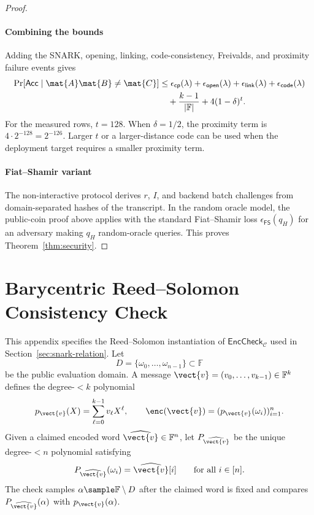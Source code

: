 \begin{proof}
\paragraph{Combining the bounds}
Adding the SNARK, opening, linking, code-consistency, Freivalds, and proximity
failure events gives
\[
\begin{aligned}
\Pr[\mathsf{Acc}\mid\mat{A}\mat{B}\neq\mat{C}]
&\le
\epsilon_{\mathsf{cp}}(\lambda)
+\epsilon_{\mathsf{open}}(\lambda)
+\epsilon_{\mathsf{link}}(\lambda)
+\epsilon_{\mathsf{code}}(\lambda)\\
&\quad+\frac{k-1}{|\mathbb{F}|}+4(1-\delta)^t .
\end{aligned}
\]
For the measured rows, \(t=128\).  When \(\delta=1/2\), the proximity term is
\(4\cdot2^{-128}=2^{-126}\).  Larger \(t\) or a larger-distance code can be
used when the deployment target requires a smaller proximity term.

\paragraph{Fiat--Shamir variant}
The non-interactive protocol derives \(r\), \(I\), and backend batch challenges
from domain-separated hashes of the transcript.  In the random oracle model,
the public-coin proof above applies with the standard Fiat--Shamir loss
\(\epsilon_{\mathsf{FS}}(q_H)\) for an adversary making \(q_H\)
random-oracle queries.
This proves Theorem~\ref{thm:security}.
\end{proof}

\section{Barycentric Reed--Solomon Consistency Check}
\label{app:rs-barycentric}

This appendix specifies the Reed--Solomon instantiation of
\(\mathsf{EncCheck}_{\mathcal{C}}\) used in
Section~\ref{sec:snark-relation}.  Let
\[
D=\{\omega_0,\ldots,\omega_{n-1}\}\subset\mathbb{F}
\]
be the public evaluation domain.  A message
\(\vect{v}=(v_0,\ldots,v_{k-1})\in\mathbb{F}^k\) defines the degree-\(<k\)
polynomial
\[
  p_{\vect{v}}(X)=\sum_{\ell=0}^{k-1} v_\ell X^\ell,
  \qquad
  \enc(\vect{v})=(p_{\vect{v}}(\omega_i))_{i=1}^{n}.
\]
Given a claimed encoded word
\(\widehat{\vect{v}}\in\mathbb{F}^n\), let
\(P_{\widehat{\vect{v}}}\) be the unique degree-\(<n\) polynomial satisfying
\[
  P_{\widehat{\vect{v}}}(\omega_i)=\widehat{\vect{v}}[i]
  \qquad\text{for all }i\in[n].
\]
The check samples \(\alpha\sample\mathbb{F}\setminus D\) after the claimed
word is fixed and compares \(P_{\widehat{\vect{v}}}(\alpha)\) with
\(p_{\vect{v}}(\alpha)\).

